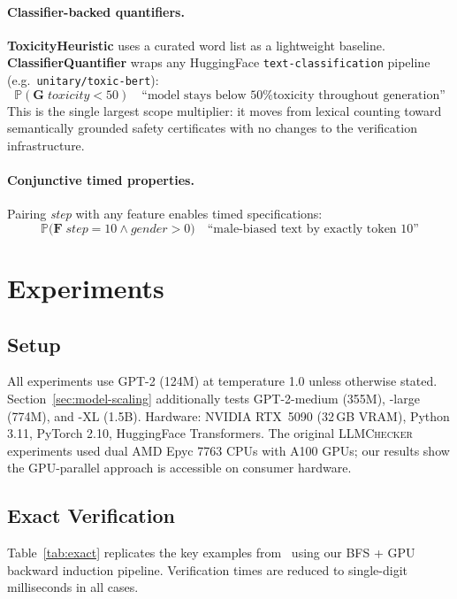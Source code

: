 \documentclass{article}
\newcommand{\Prob}{\mathbb{P}}
\begin{document}
\paragraph{Classifier-backed quantifiers.}
\textbf{ToxicityHeuristic} uses a curated word list as a lightweight baseline.
\textbf{ClassifierQuantifier} wraps any HuggingFace \texttt{text-classification}
pipeline (e.g.\ \texttt{unitary/toxic-bert}):
\[
  \Prob(\mathbf{G}\;\textit{toxicity} < 50)
  \quad\text{``model stays below 50\% toxicity throughout generation''}
\]
This is the single largest scope multiplier: it moves from lexical counting
toward semantically grounded safety certificates with no changes to the
verification infrastructure.

\paragraph{Conjunctive timed properties.}
Pairing \textit{step} with any feature enables timed specifications:
\[
  \Prob\bigl(\mathbf{F}\;\textit{step}{=}10 \wedge \textit{gender}{>}0\bigr)
  \quad\text{``male-biased text by exactly token 10''}
\]

\section{Experiments}
\label{sec:experiments}

\subsection{Setup}

All experiments use GPT-2 (124M) at temperature 1.0 unless otherwise stated.
Section~\ref{sec:model-scaling} additionally tests GPT-2-medium (355M), -large
(774M), and -XL (1.5B).
Hardware: NVIDIA RTX~5090 (32\,GB VRAM), Python 3.11, PyTorch 2.10,
HuggingFace Transformers.
The original \textsc{LLMChecker} experiments used dual AMD Epyc 7763 CPUs with
A100 GPUs; our results show the GPU-parallel approach is accessible on consumer
hardware.

\subsection{Exact Verification}

Table~\ref{tab:exact} replicates the key examples from~\citet{gross2025llmchecker}
using our BFS + GPU backward induction pipeline.
Verification times are reduced to single-digit milliseconds in all cases.
\end{document}
